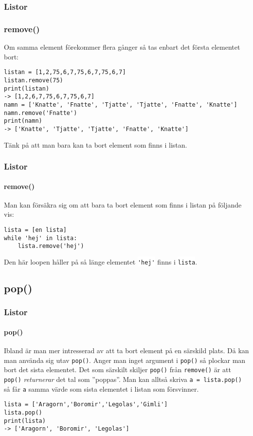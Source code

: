 \documentclass[aspectratio=169]{beamer}
\newcommand{\code}[1]{\colorbox{white}{\lstinline{#1}}}
\begin{document}
\begin{frame}[fragile]
\frametitle{Listor}
\frametitle{remove()}

Om samma element förekommer flera gånger så tas enbart det första elementet bort:

\begin{lstlisting}
listan = [1,2,75,6,7,75,6,7,75,6,7]
listan.remove(75)
print(listan)
-> [1,2,6,7,75,6,7,75,6,7]
namn = ['Knatte', 'Fnatte', 'Tjatte', 'Tjatte', 'Fnatte', 'Knatte']
namn.remove('Fnatte')
print(namn)
-> ['Knatte', 'Tjatte', 'Tjatte', 'Fnatte', 'Knatte']
\end{lstlisting}

Tänk på att man bara kan ta bort element som finns i listan.

\end{frame}

\begin{frame}[fragile]
\frametitle{Listor}
\framesubtitle{remove()}

Man kan försäkra sig om att bara ta bort element som finns i listan på följande vis:

\begin{lstlisting}
lista = [en lista]
while 'hej' in lista:
    lista.remove('hej')
\end{lstlisting}

Den här loopen håller på så länge elementet \code{'hej'} finns i \code{lista}.

\end{frame}

\subsection{pop()}

\begin{frame}[fragile]
\frametitle{Listor}
\framesubtitle{pop()}

Ibland är man mer intresserad av att ta bort element på en särskild plats. Då kan man använda sig utav \code{pop()}. Anger man inget argument i \code{pop()} så plockar man bort det sista elementet. Det som särskilt skiljer \code{pop()} från \code{remove()} är att \code{pop()} \textit{returnerar} det tal som ''poppas''. Man kan alltså skriva \code{a = lista.pop()} så får \code{a} samma värde som sista elementet i listan som försvinner.

\begin{lstlisting}
lista = ['Aragorn','Boromir','Legolas','Gimli']
lista.pop()
print(lista)
-> ['Aragorn', 'Boromir', 'Legolas']
\end{lstlisting}

\end{frame}
\end{document}
